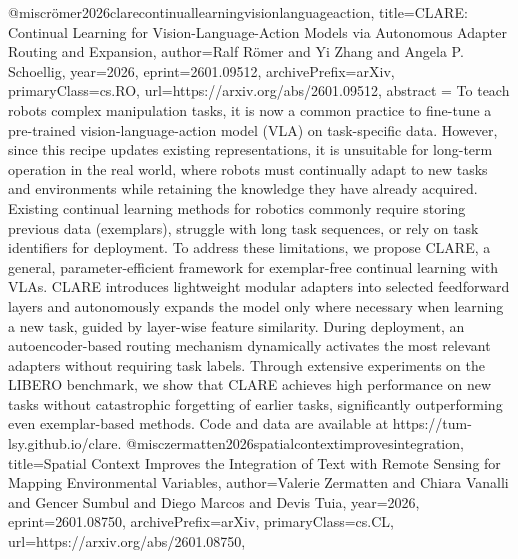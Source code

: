 {}@misc{römer2026clarecontinuallearningvisionlanguageaction,
      title={CLARE: Continual Learning for Vision-Language-Action Models via Autonomous Adapter Routing and Expansion}, 
      author={Ralf Römer and Yi Zhang and Angela P. Schoellig},
      year={2026},
      eprint={2601.09512},
      archivePrefix={arXiv},
      primaryClass={cs.RO},
      url={https://arxiv.org/abs/2601.09512},
      abstract = {To teach robots complex manipulation tasks, it is now a common practice to fine-tune a pre-trained vision-language-action model (VLA) on task-specific data. However, since this recipe updates existing representations, it is unsuitable for long-term operation in the real world, where robots must continually adapt to new tasks and environments while retaining the knowledge they have already acquired. Existing continual learning methods for robotics commonly require storing previous data (exemplars), struggle with long task sequences, or rely on task identifiers for deployment. To address these limitations, we propose CLARE, a general, parameter-efficient framework for exemplar-free continual learning with VLAs. CLARE introduces lightweight modular adapters into selected feedforward layers and autonomously expands the model only where necessary when learning a new task, guided by layer-wise feature similarity. During deployment, an autoencoder-based routing mechanism dynamically activates the most relevant adapters without requiring task labels. Through extensive experiments on the LIBERO benchmark, we show that CLARE achieves high performance on new tasks without catastrophic forgetting of earlier tasks, significantly outperforming even exemplar-based methods. Code and data are available at https://tum-lsy.github.io/clare.}
}@misc{zermatten2026spatialcontextimprovesintegration,
      title={Spatial Context Improves the Integration of Text with Remote Sensing for Mapping Environmental Variables}, 
      author={Valerie Zermatten and Chiara Vanalli and Gencer Sumbul and Diego Marcos and Devis Tuia},
      year={2026},
      eprint={2601.08750},
      archivePrefix={arXiv},
      primaryClass={cs.CL},
      url={https://arxiv.org/abs/2601.08750},
}
